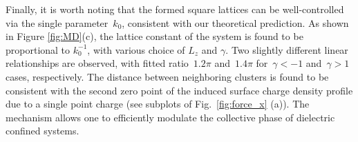 Finally, it is worth noting that the formed square lattices can be well-controlled via the single parameter~$k_0$, consistent with our theoretical prediction.
As shown in Figure \ref{fig:MD}(c), the lattice constant of the system is found to be proportional to $k_0^{-1}$, with various choice of $L_z$ and $\gamma$. 
Two slightly different linear relationships are observed, with fitted ratio~$1.2 \pi$ and~$1.4 \pi$ for~$\gamma < -1$ and~$\gamma > 1$ cases, respectively. 
The distance between neighboring clusters is found to be consistent with the second zero point of the induced surface charge density profile due to a single point charge (see subplots of Fig.~\ref{fig:force_x} (a)). The mechanism allows one to efficiently modulate the collective phase of dielectric confined systems.